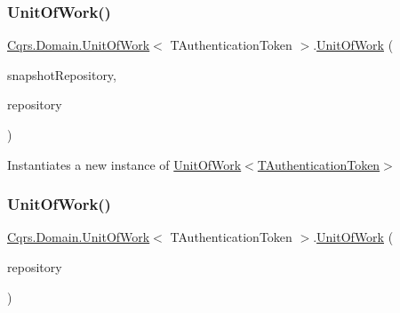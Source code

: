 \subsubsection{\texorpdfstring{Unit\+Of\+Work()}{UnitOfWork()}\hspace{0.1cm}{\footnotesize\ttfamily [1/2]}}
{\footnotesize\ttfamily \hyperlink{classCqrs_1_1Domain_1_1UnitOfWork}{Cqrs.\+Domain.\+Unit\+Of\+Work}$<$ T\+Authentication\+Token $>$.\hyperlink{classCqrs_1_1Domain_1_1UnitOfWork}{Unit\+Of\+Work} (\begin{DoxyParamCaption}\item[{\hyperlink{interfaceCqrs_1_1Domain_1_1ISnapshotAggregateRepository}{I\+Snapshot\+Aggregate\+Repository}$<$ T\+Authentication\+Token $>$}]{snapshot\+Repository,  }\item[{\hyperlink{interfaceCqrs_1_1Domain_1_1IAggregateRepository}{I\+Aggregate\+Repository}$<$ T\+Authentication\+Token $>$}]{repository }\end{DoxyParamCaption})}



Instantiates a new instance of \hyperlink{classCqrs_1_1Domain_1_1UnitOfWork_a9ec92dbd580f3885f7cf5a9ad360e1ac_a9ec92dbd580f3885f7cf5a9ad360e1ac}{Unit\+Of\+Work$<$\+T\+Authentication\+Token$>$} 

\mbox{\label{classCqrs_1_1Domain_1_1UnitOfWork_a717facda044d5025e9d7abdec4f54acd_a717facda044d5025e9d7abdec4f54acd}} 
\subsubsection{\texorpdfstring{Unit\+Of\+Work()}{UnitOfWork()}\hspace{0.1cm}{\footnotesize\ttfamily [2/2]}}
{\footnotesize\ttfamily \hyperlink{classCqrs_1_1Domain_1_1UnitOfWork}{Cqrs.\+Domain.\+Unit\+Of\+Work}$<$ T\+Authentication\+Token $>$.\hyperlink{classCqrs_1_1Domain_1_1UnitOfWork}{Unit\+Of\+Work} (\begin{DoxyParamCaption}\item[{\hyperlink{interfaceCqrs_1_1Domain_1_1IAggregateRepository}{I\+Aggregate\+Repository}$<$ T\+Authentication\+Token $>$}]{repository }\end{DoxyParamCaption})}



